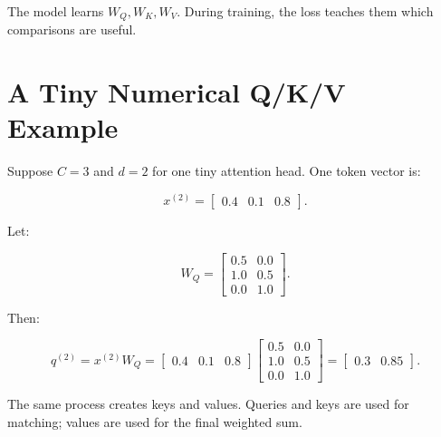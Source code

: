 The model learns \(W_Q,W_K,W_V\). During training, the loss teaches them which comparisons are useful.

\section{A Tiny Numerical Q/K/V Example}

Suppose \(C=3\) and \(d=2\) for one tiny attention head. One token vector is:

\[
x^{(2)} =
\begin{bmatrix}
0.4 & 0.1 & 0.8
\end{bmatrix}.
\]

Let:

\[
W_Q =
\begin{bmatrix}
0.5 & 0.0\\
1.0 & 0.5\\
0.0 & 1.0
\end{bmatrix}.
\]

Then:

\[
q^{(2)} = x^{(2)}W_Q
=
\begin{bmatrix}
0.4 & 0.1 & 0.8
\end{bmatrix}
\begin{bmatrix}
0.5 & 0.0\\
1.0 & 0.5\\
0.0 & 1.0
\end{bmatrix}
=
\begin{bmatrix}
0.3 & 0.85
\end{bmatrix}.
\]

\begin{center}
\end{center}

The same process creates keys and values. Queries and keys are used for matching; values are used for the final weighted sum.

